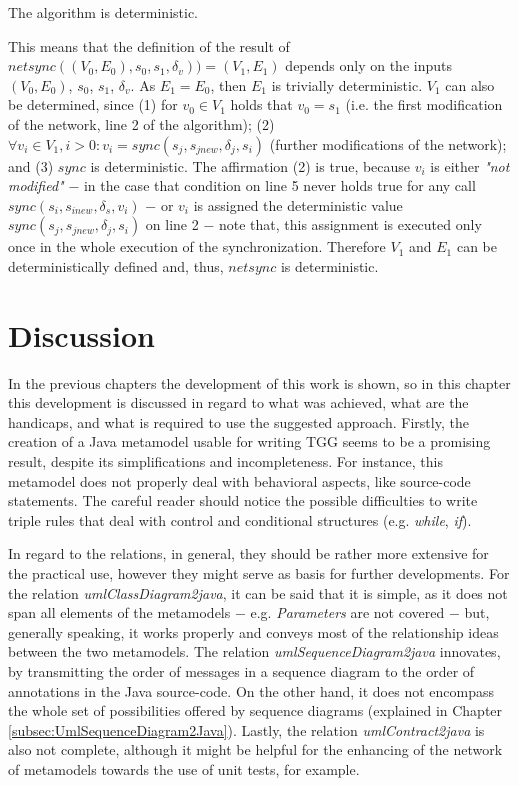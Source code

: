 \documentclass[tuberlin,cic,tc,english,noabntcite,oneside]{iiufrgs}
\begin{document}
\begin{theorem}
	The algorithm is deterministic.
\end{theorem}

This means that the definition of the result of $netsync((V_0,E_0), s_0, s_1, \delta_v)) = (V_1,E_1)$ depends only on the inputs $(V_0,E_0)$, $s_0$, $s_1$, $\delta_v$. As $E_1 = E_0$, then $E_1$ is trivially deterministic. $V_1$ can also be determined, since (1) for $v_0 \in V_1$ holds that $v_0 = s_1$ (i.e. the first modification of the network, line 2 of the algorithm); (2) $\forall v_i \in V_1, i > 0: v_i = sync(s_j, s_{jnew}, \delta_j, s_i)$ (further modifications of the network); and (3) $sync$ is deterministic. The affirmation (2) is true, because $v_i$ is either \emph{"not modified"} $-$ in the case that condition on line 5 never holds true for any call $sync(s_i, s_{inew}, \delta_s, v_i)$ $-$ or $v_i$ is assigned the deterministic value $sync(s_j, s_{jnew}, \delta_j, s_i)$ on line 2 $-$ note that, this assignment is executed only once in the whole execution of the synchronization. Therefore $V_1$ and $E_1$ can be deterministically defined and, thus, $netsync$ is deterministic.

\chapter{Discussion}
\label{chapter:discussion}

In the previous chapters the development of this work is shown, so in this chapter this development is discussed in regard to what was achieved, what are the handicaps, and what is required to use the suggested approach. Firstly, the creation of a Java metamodel usable for writing TGG seems to be a promising result, despite its simplifications and incompleteness. For instance, this metamodel does not properly deal with behavioral aspects, like source-code statements. The careful reader should notice the possible difficulties to write triple rules that deal with control and conditional structures (e.g. \emph{while}, \emph{if}).

In regard to the relations, in general, they should be rather more extensive for the practical use, however they might serve as basis for further developments. For the relation \emph{umlClassDiagram2java}, it can be said that it is simple, as it does not span all elements of the metamodels $-$ e.g. \emph{Parameters} are not covered $-$ but, generally speaking, it works properly and conveys most of the relationship ideas between the two metamodels. The relation \emph{umlSequenceDiagram2java} innovates, by transmitting the order of messages in a sequence diagram to the order of annotations in the Java source-code. On the other hand, it does not encompass the whole set of possibilities offered by sequence diagrams (explained in Chapter \ref{subsec:UmlSequenceDiagram2Java}). Lastly, the relation \emph{umlContract2java} is also not complete, although it might be helpful for the enhancing of the network of metamodels towards the use of unit tests, for example.
\end{document}
